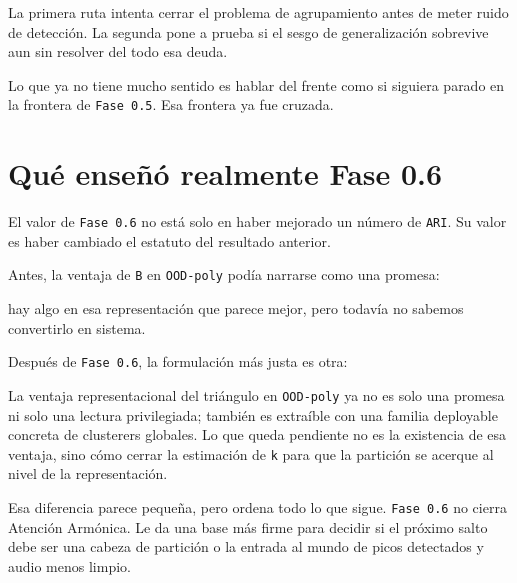 \documentclass[11pt]{article}
\begin{document}
La primera ruta intenta cerrar el problema de agrupamiento antes de meter ruido de detección. La segunda pone a prueba si el sesgo de generalización sobrevive aun sin resolver del todo esa deuda.

Lo que ya no tiene mucho sentido es hablar del frente como si siguiera parado en la frontera de \texttt{Fase 0.5}. Esa frontera ya fue cruzada.

\section{Qué enseñó realmente Fase 0.6}

El valor de \texttt{Fase 0.6} no está solo en haber mejorado un número de \texttt{ARI}. Su valor es haber cambiado el estatuto del resultado anterior.

Antes, la ventaja de \texttt{B} en \texttt{OOD-poly} podía narrarse como una promesa:

\begin{quietbox}
hay algo en esa representación que parece mejor, pero todavía no sabemos convertirlo en sistema.
\end{quietbox}

Después de \texttt{Fase 0.6}, la formulación más justa es otra:

\begin{goldbox}
La ventaja representacional del triángulo en \texttt{OOD-poly} ya no es solo una promesa ni solo una lectura privilegiada; también es extraíble con una familia deployable concreta de clusterers globales. Lo que queda pendiente no es la existencia de esa ventaja, sino cómo cerrar la estimación de \texttt{k} para que la partición se acerque al nivel de la representación.
\end{goldbox}

Esa diferencia parece pequeña, pero ordena todo lo que sigue. \texttt{Fase 0.6} no cierra Atención Armónica. Le da una base más firme para decidir si el próximo salto debe ser una cabeza de partición o la entrada al mundo de picos detectados y audio menos limpio.
\end{document}
